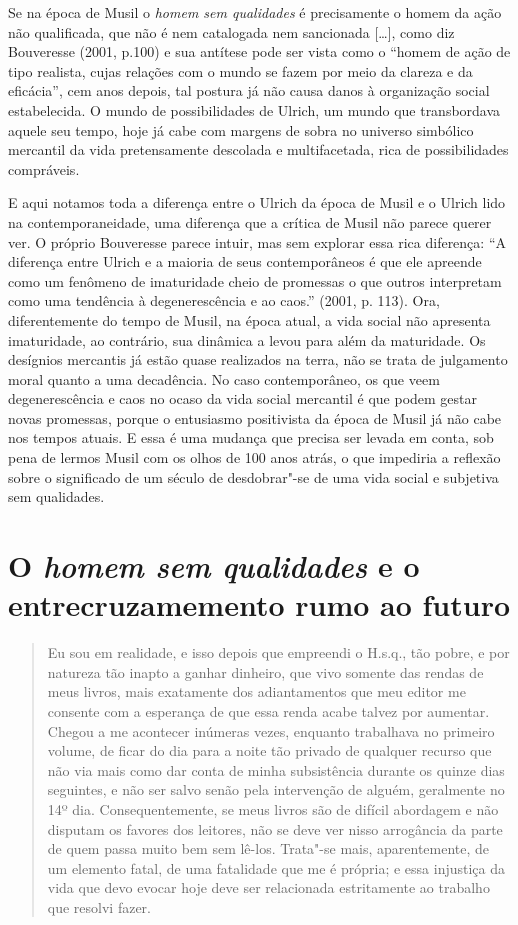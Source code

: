 Se na época de Musil o \emph{homem sem qualidades} é precisamente o
homem da ação não qualificada, que não é nem catalogada nem sancionada
[\ldots{}], como diz Bouveresse (2001, p.100) e sua antítese pode
ser vista como o ``homem de ação de tipo realista, cujas relações com o
mundo se fazem por meio da clareza e da eficácia'', cem anos depois, tal
postura já não causa danos à organização social estabelecida. O mundo de
possibilidades de Ulrich, um mundo que transbordava aquele seu tempo,
hoje já cabe com margens de sobra no universo simbólico mercantil da
vida pretensamente descolada e multifacetada, rica de possibilidades
compráveis.

E aqui notamos toda a diferença entre o Ulrich da época de Musil e o
Ulrich lido na contemporaneidade, uma diferença que a crítica de Musil
não parece querer ver. O próprio Bouveresse parece intuir, mas sem
explorar essa rica diferença: ``A diferença entre Ulrich e a maioria de
seus contemporâneos é que ele apreende como um fenômeno de imaturidade
cheio de promessas o que outros interpretam como uma tendência à
degenerescência e ao caos.'' (2001, p. 113). Ora, diferentemente do
tempo de Musil, na época atual, a vida social não apresenta imaturidade,
ao contrário, sua dinâmica a levou para além da maturidade. Os desígnios
mercantis já estão quase realizados na terra, não se trata de julgamento
moral quanto a uma decadência. No caso contemporâneo, os que veem
degenerescência e caos no ocaso da vida social mercantil é que podem
gestar novas promessas, porque o entusiasmo positivista da época de
Musil já não cabe nos tempos atuais. E essa é uma mudança que precisa
ser levada em conta, sob pena de lermos Musil com os olhos de 100 anos
atrás, o que impediria a reflexão sobre o significado de um século de
desdobrar"-se de uma vida social e subjetiva sem qualidades.

\section{O \emph{homem sem qualidades} e o entrecruzamemento rumo ao futuro}

\begin{quote}
Eu sou em realidade, e isso depois que empreendi o H.s.q., tão pobre, e
por natureza tão inapto a ganhar dinheiro, que vivo somente das rendas
de meus livros, mais exatamente dos adiantamentos que meu editor me
consente com a esperança de que essa renda acabe talvez por aumentar.
Chegou a me acontecer inúmeras vezes, enquanto trabalhava no primeiro
volume, de ficar do dia para a noite tão privado de qualquer recurso que
não via mais como dar conta de minha subsistência durante os quinze dias
seguintes, e não ser salvo senão pela intervenção de alguém, geralmente
no 14º dia. Consequentemente, se meus livros são de difícil abordagem e
não disputam os favores dos leitores, não se deve ver nisso arrogância
da parte de quem passa muito bem sem lê-los. Trata"-se mais,
aparentemente, de um elemento fatal, de uma fatalidade que me é própria;
e essa injustiça da vida que devo evocar hoje deve ser relacionada
estritamente ao trabalho que resolvi fazer.
\end{quote}


